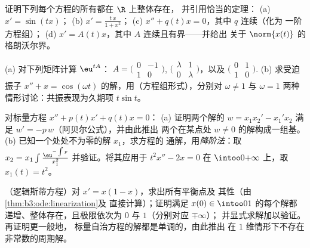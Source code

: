 \begin{exercise}[$\star\star$]\label{exo:b3:ode:3}
证明下列每个方程的所有都在 $\R$ 上整体存在，
并引用恰当的定理：
(a) $x' = \sin(tx)$；
(b) $x' = \frac{t\,x}{1 + x^2}$；
(c) $x'' + q(t)x = 0$，其中 $q$ 连续（化为
一阶方程组）；
(d) $x' = A(t)x$，其中 $A$ 连续且有界——并给出
关于 $\norm{x(t)}$ 的格朗沃尔界。
\end{exercise}

\begin{exercise}[$\star\star$]\label{exo:b3:ode:4}
(a) 对下列矩阵计算 $\eu^{tA}$：
$A = \bigl(\begin{smallmatrix}0 & -1\\ 1 &
0\end{smallmatrix}\bigr)$,
$\bigl(\begin{smallmatrix}\lambda & 1\\ 0 &
\lambda\end{smallmatrix}\bigr)$，以及
$\bigl(\begin{smallmatrix}0 & 1\\ 1 &
0\end{smallmatrix}\bigr)$.
(b) 求受迫振子 $x'' + x = \cos(\omega t)$
的解，用（方程组形式），分别对 $\omega \neq 1$ 与 $\omega =
1$ 两种情形讨论：共振表现为久期项 $t\sin t$。
\end{exercise}

\begin{exercise}[$\star\star$]\label{exo:b3:ode:5}
对标量方程 $x'' + p(t)x' + q(t)x = 0$：
(a) 证明两个解的 $w = x_1x_2' - x_1'x_2$
满足 $w' = -p\,w$（阿贝尔公式），并由此推出
两个在某点处 $w \neq 0$ 的解构成一组基。
(b) 已知一个处处不为零的解 $x_1$，求方程的
通解，用\emph{降阶法}：取 $x_2 = x_1\int
\frac{\eu^{-\int p}}{x_1^2}$ 并验证。将其应用于 $t^2x'' -
2x = 0$ 在 $\intoo0{+\infty}$ 上，取 $x_1(t) = t^2$。
\end{exercise}

\begin{exercise}[$\star\star$]\label{exo:b3:ode:6}
（逻辑斯蒂方程）对 $x' = x(1 - x)$，求出所有平衡点及
其性（由\cref{thm:b3:ode:linearization}及
直接计算）；证明满足 $x(0) \in \intoo01$ 的每个解都
递增、整体存在，且极限依次为 $0$ 与 $1$（分别对应 $\mp\infty$）；
并显式求解加以验证。再证明更一般地，
标量自治方程的解都是单调的，由此推出
在 $1$ 维情形下不存在非常数的周期解。
\end{exercise}

